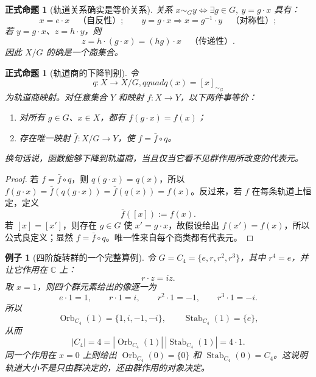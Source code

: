 \documentclass[UTF8,fontset=none,a4paper,11pt]{ctexart}
\theoremstyle{foundation-definition}
\theoremstyle{foundation-theorem}
\theoremstyle{foundation-proposition}
\newtheorem{proposition}[definition]{正式命题}
\theoremstyle{foundation-example}
\newtheorem{example}[definition]{例子}
\theoremstyle{foundation-remark}
\theoremstyle{foundation-theorem}
\begin{document}
\begin{proposition}[轨道关系确实是等价关系]
关系 \(x\sim_G y\Longleftrightarrow \exists g\in G,\ y=g\cdot x\) 具有：
\[
x=e\cdot x \quad\text{（自反性）};\qquad
y=g\cdot x\Rightarrow x=g^{-1}\cdot y \quad\text{（对称性）};
\]
若 \(y=g\cdot x\)、\(z=h\cdot y\)，则
\[
z=h\cdot(g\cdot x)=(hg)\cdot x \quad\text{（传递性）}.
\]
因此 \(X/G\) 的确是一个商集合。
\end{proposition}

\begin{proposition}[轨道商的下降判别]\label{prop:orbit-quotient-descent}
令
\[
q:X\longrightarrow X/G,qquad q(x)=[x]_{\sim_G}
\]
为轨道商映射。对任意集合 \(Y\) 和映射 \(f:X\to Y\)，以下两件事等价：
\begin{enumerate}[label=(\roman*)]
  \item 对所有 \(g\in G\)、\(x\in X\)，都有 \(f(g\cdot x)=f(x)\)；
  \item 存在唯一映射 \(\bar f:X/G\to Y\)，使 \(f=\bar f\circ q\)。
\end{enumerate}
换句话说，函数能够下降到轨道商，当且仅当它看不见群作用所改变的代表元。
\end{proposition}

\begin{proof}
若 \(f=\bar f\circ q\)，则 \(q(g\cdot x)=q(x)\)，所以
\(f(g\cdot x)=\bar f(q(g\cdot x))=\bar f(q(x))=f(x)\)。反过来，若 \(f\) 在每条轨道上恒定，定义
\[
\bar f([x]):=f(x).
\]
若 \([x]=[x']\)，则存在 \(g\in G\) 使 \(x'=g\cdot x\)，故假设给出
\(f(x')=f(x)\)，所以公式良定义；显然 \(f=\bar f\circ q\)。唯一性来自每个商类都有代表元。
\end{proof}

\begin{example}[四阶旋转群的一个完整算例]\label{ex:c4-orbit-concrete}
令 \(G=C_4=\{e,r,r^2,r^3\}\)，其中 \(r^4=e\)，并让它作用在
\(\mathbb C\) 上：
\[
r\cdot z=iz.
\]
取 \(x=1\)，则四个群元素给出的像逐一为
\[
e\cdot1=1,\qquad r\cdot1=i,\qquad r^2\cdot1=-1,\qquad r^3\cdot1=-i.
\]
所以
\[
\operatorname{Orb}_{C_4}(1)=\{1,i,-1,-i\},\qquad
\operatorname{Stab}_{C_4}(1)=\{e\},
\]
从而
\[
|C_4|=4=|\operatorname{Orb}_{C_4}(1)|\,|\operatorname{Stab}_{C_4}(1)|=4\cdot1.
\]
同一个作用在 \(x=0\) 上则给出
\(\operatorname{Orb}_{C_4}(0)=\{0\}\) 和
\(\operatorname{Stab}_{C_4}(0)=C_4\)。这说明轨道大小不是只由群决定的，还由群作用的对象决定。
\end{example}
\end{document}

